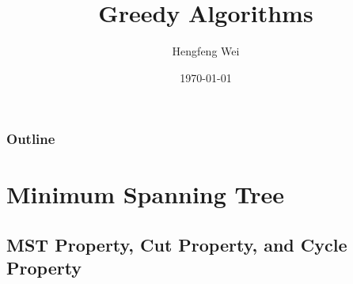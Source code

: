 \documentclass{beamer}
\title{Greedy Algorithms}
\author{Hengfeng Wei}
\institute{hengxin0912@gmail.com}
\date{\today}
\begin{document}
\begin{frame}
	\titlepage
\end{frame}

\begin{frame}
	\frametitle{Outline}
	\tableofcontents
\end{frame}

\section{Minimum Spanning Tree}

\subsection{MST Property, Cut Property, and Cycle Property}
\end{document}
